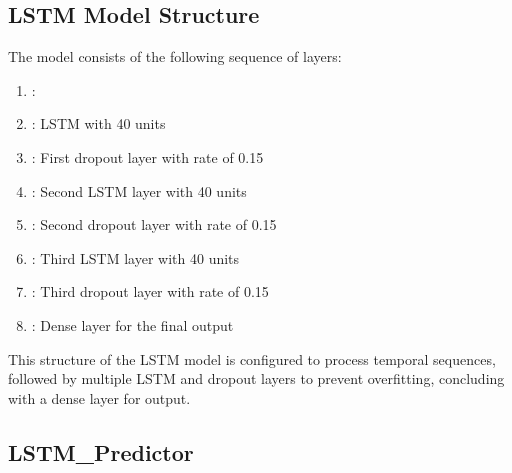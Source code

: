 \documentclass[letterpaper,10pt,english]{sphinxmanual}
\begin{document}
\subsection{LSTM Model Structure}
\label{\detokenize{docs/LSTM_model:lstm-model-structure}}
\sphinxAtStartPar
The model consists of the following sequence of layers:
\begin{enumerate}
%
\item {} 
\sphinxAtStartPar
{}:

\item {} 
\sphinxAtStartPar
{}:
\sphinxhyphen{} LSTM with 40 units

\item {} 
\sphinxAtStartPar
{}:
\sphinxhyphen{} First dropout layer with rate of 0.15

\item {} 
\sphinxAtStartPar
{}:
\sphinxhyphen{} Second LSTM layer with 40 units

\item {} 
\sphinxAtStartPar
{}:
\sphinxhyphen{} Second dropout layer with rate of 0.15

\item {} 
\sphinxAtStartPar
{}:
\sphinxhyphen{} Third LSTM layer with 40 units

\item {} 
\sphinxAtStartPar
{}:
\sphinxhyphen{} Third dropout layer with rate of 0.15

\item {} 
\sphinxAtStartPar
{}:
\sphinxhyphen{} Dense layer for the final output

\end{enumerate}

\sphinxAtStartPar
This structure of the LSTM model is configured to process temporal sequences,
followed by multiple LSTM and dropout layers to prevent overfitting, concluding with a dense layer for output.


\subsection{LSTM\_Predictor}
\label{\detokenize{docs/LSTM_model:lstm-predictor}}
\end{document}
